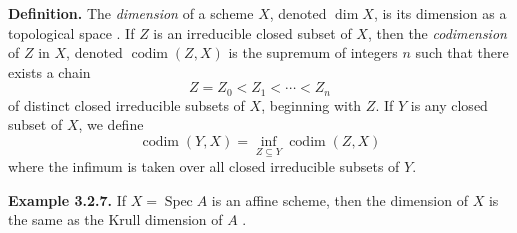 {\medskip
\noindent\textbf{Definition.} The \emph{dimension} of a scheme $X$, denoted $\dim X$, is its dimension as a topological space . If $Z$ is an irreducible closed subset of $X$, then the \emph{codimension} of $Z$ in $X$, denoted $\operatorname{codim}(Z,X)$ is the supremum of integers $n$ such that there exists a chain
\[
Z=Z_0<Z_1<\cdots<Z_n
\]
of distinct closed irreducible subsets of $X$, beginning with $Z$. If $Y$ is any closed subset of $X$, we define
\[
\operatorname{codim}(Y,X)=\inf_{Z\subseteq Y}\operatorname{codim}(Z,X)
\]
where the infimum is taken over all closed irreducible subsets of $Y$.

\medskip
\noindent\hypertarget{result-II-3.2.7}{}\textbf{Example 3.2.7.} If $X=\operatorname{Spec}A$ is an affine scheme, then the dimension of $X$ is the same as the Krull dimension of $A$ .}
